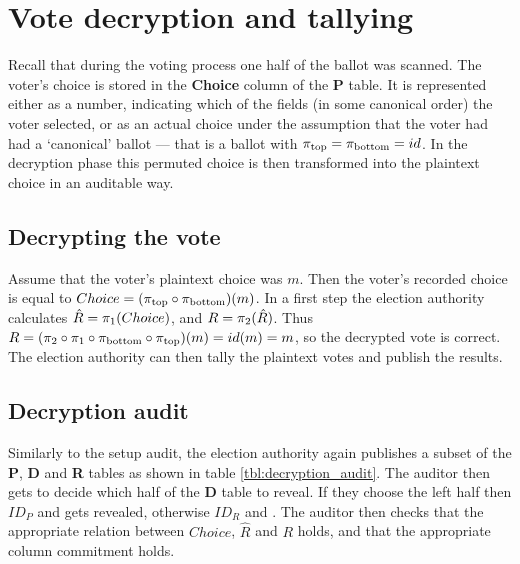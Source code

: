 \chapter{Vote decryption and tallying}
\label{ch:tally}

Recall that during the voting process one half of the ballot was scanned. The
voter's choice is stored in the \textbf{Choice} column of the \textbf{P} table. It
is represented either as a number, indicating which of the fields (in some
canonical order) the voter selected, or as an actual choice under the
assumption that the voter had had a `canonical' ballot --- that is a ballot
with $\pi_{\text{top}} = \pi_{\text{bottom}} = id$. In the decryption phase this permuted choice is
then transformed into the plaintext choice in an auditable way.

\section{Decrypting the vote}

Assume that the voter's plaintext choice was $m$. Then the voter's recorded
choice is equal to $Choice = (\pi_{\text{top}}{} \circ \pi_{\text{bottom}}{})(m)$. In a first step
the election authority calculates $\hat{R} = \pi_1{}(Choice)$, and $R =
\pi_2{}(\hat{R})$. Thus $R = (\pi_2 \circ \pi_1 \circ \pi_{\text{bottom}} \circ \pi_{\text{top}})(m)
= id(m) = m$, so the decrypted vote is correct. The election authority can then
tally the plaintext votes and publish the results.

\section{Decryption audit}

Similarly to the setup audit, the election authority again publishes a subset
of the \textbf{P}, \textbf{D} and \textbf{R} tables as shown in table
\ref{tbl:decryption_audit}. The auditor then gets to decide which half of the
\textbf{D} table to reveal. If they choose the left half then $ID_P$ and \pone{}
gets revealed, otherwise $ID_R$ and \ptwo{}. The auditor then checks that the
appropriate relation between $Choice$, $\hat{R}$ and $R$ holds, and that the
appropriate column commitment holds.

